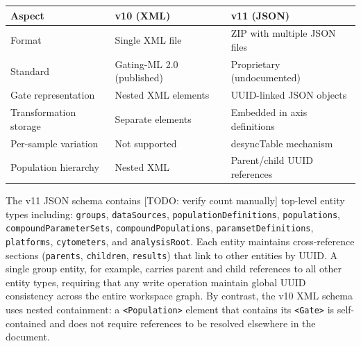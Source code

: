 \documentclass[
]{article}
\begin{document}
\begin{longtable}[]{@{}
  >{\raggedright\arraybackslash}p{}
  >{\raggedright\arraybackslash}p{}
  >{\raggedright\arraybackslash}p{}@{}}
\toprule\noalign{}
\begin{minipage}[b]{\linewidth}\raggedright
Aspect
\end{minipage} & \begin{minipage}[b]{\linewidth}\raggedright
v10 (XML)
\end{minipage} & \begin{minipage}[b]{\linewidth}\raggedright
v11 (JSON)
\end{minipage} \\
\midrule\noalign{}
\endhead
\bottomrule\noalign{}
\endlastfoot
Format & Single XML file & ZIP with multiple JSON files \\
Standard & Gating-ML 2.0 (published) & Proprietary (undocumented) \\
Gate representation & Nested XML elements & UUID-linked JSON objects \\
Transformation storage & Separate elements & Embedded in axis
definitions \\
Per-sample variation & Not supported & desyncTable mechanism \\
Population hierarchy & Nested XML & Parent/child UUID references \\
\end{longtable}

The v11 JSON schema contains
\textcolor{pending}{[TODO: verify count manually]} top-level entity
types including: \texttt{groups}, \texttt{dataSources},
\texttt{populationDefinitions}, \texttt{populations},
\texttt{compoundParameterSets}, \texttt{compoundPopulations},
\texttt{paramsetDefinitions}, \texttt{platforms}, \texttt{cytometers},
and \texttt{analysisRoot}. Each entity maintains cross-reference
sections (\texttt{parents}, \texttt{children}, \texttt{results}) that
link to other entities by UUID. A single group entity, for example,
carries parent and child references to all other entity types, requiring
that any write operation maintain global UUID consistency across the
entire workspace graph. By contrast, the v10 XML schema uses nested
containment: a \texttt{\textless{}Population\textgreater{}} element that
contains its \texttt{\textless{}Gate\textgreater{}} is self-contained
and does not require references to be resolved elsewhere in the
document.
\end{document}
